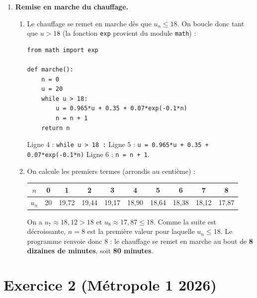 \documentclass[11pt,a4paper]{article}
\newcommand{\exo}[1]{\section*{#1}}
\begin{document}
\begin{enumerate}
\begin{enumerate}
\item On résout :
\[
x = 0{,}965\,x + 0{,}35 \iff 0{,}035\,x = 0{,}35 \iff x = \dfrac{0{,}35}{0{,}035} = 10.
\]
Donc $\ell = 10$.

\emph{Interprétation.} À long terme, la température de la pièce se stabilise à $10\,^{\circ}\mathrm{C}$
(température vers laquelle la pièce tend à se refroidir sans chauffage).
\end{enumerate}

\item \textbf{Remise en marche du chauffage.}

\begin{enumerate}
\item Le chauffage se remet en marche dès que $u_n \leqslant 18$.
On boucle donc tant que $u > 18$ (la fonction \texttt{exp} provient du module \texttt{math}) :
\begin{lstlisting}
from math import exp

def marche():
    n = 0
    u = 20
    while u > 18:
        u = 0.965*u + 0.35 + 0.07*exp(-0.1*n)
        n = n + 1
    return n
\end{lstlisting}
Ligne 4 : \texttt{while u > 18 :}\quad
Ligne 5 : \texttt{u = 0.965*u + 0.35 + 0.07*exp(-0.1*n)}\quad
Ligne 6 : \texttt{n = n + 1}.

\item On calcule les premiers termes (arrondis au centième) :
\begin{center}
\begin{tabular}{|c|*{9}{c|}}
\hline
$n$ & 0 & 1 & 2 & 3 & 4 & 5 & 6 & 7 & 8 \\ \hline
$u_n$ & 20 & 19,72 & 19,44 & 19,17 & 18,90 & 18,64 & 18,38 & 18,12 & 17,87 \\ \hline
\end{tabular}
\end{center}
On a $u_7 \approx 18{,}12 > 18$ et $u_8 \approx 17{,}87 \leqslant 18$.
Comme la suite est décroissante, $n=8$ est la première valeur pour laquelle $u_n\leqslant 18$.
Le programme renvoie donc $8$ : le chauffage se remet en marche au bout de
\textbf{8 dizaines de minutes}, soit \textbf{80 minutes}.
\end{enumerate}

\end{enumerate}

\newpage
\exo{Exercice 2 (Métropole 1 2026)}
\end{document}
